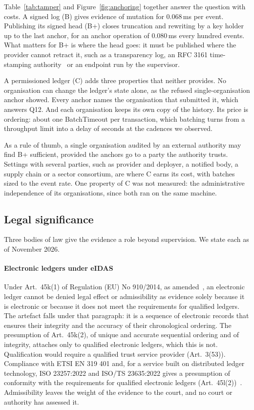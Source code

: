 Table~\ref{tab:tamper} and Figure~\ref{fig:anchoring} together answer the question with costs. A signed log (B) gives evidence of mutation for 0.068\,ms per event. Publishing its signed head (B+) closes truncation and rewriting by a key holder up to the last anchor, for an anchor operation of 0.080\,ms every hundred events. What matters for B+ is where the head goes: it must be published where the provider cannot retract it, such as a transparency log, an RFC 3161 time-stamping authority~\cite{rfc3161} or an endpoint run by the supervisor.

A permissioned ledger (C) adds three properties that neither provides. No organisation can change the ledger's state alone, as the refused single-organisation anchor showed. Every anchor names the organisation that submitted it, which answers Q12. And each organisation keeps its own copy of the history. Its price is ordering: about one BatchTimeout per transaction, which batching turns from a throughput limit into a delay of seconds at the cadences we observed.

As a rule of thumb, a single organisation audited by an external authority may find B+ sufficient, provided the anchors go to a party the authority trusts. Settings with several parties, such as provider and deployer, a notified body, a supply chain or a sector consortium, are where C earns its cost, with batches sized to the event rate. One property of C was not measured: the administrative independence of its organisations, since both ran on the same machine.

\subsection{Legal significance}
\label{sec:disc-legal}

Three bodies of law give the evidence a role beyond supervision. We state each as of November 2026.

\paragraph{Electronic ledgers under eIDAS} Under Art.~45k(1) of Regulation (EU) No 910/2014, as amended~\cite{eidas_2024}, an electronic ledger cannot be denied legal effect or admissibility as evidence solely because it is electronic or because it does not meet the requirements for qualified ledgers. The artefact falls under that paragraph: it is a sequence of electronic records that ensures their integrity and the accuracy of their chronological ordering. The presumption of Art.~45k(2), of unique and accurate sequential ordering and of integrity, attaches only to qualified electronic ledgers, which this is not. Qualification would require a qualified trust service provider (Art.~3(53)). Compliance with ETSI EN 319 401 and, for a service built on distributed ledger technology, ISO 23257:2022 and ISO/TS 23635:2022 gives a presumption of conformity with the requirements for qualified electronic ledgers (Art.~45l(2))~\cite{qel_2025,alamillo2024}. Admissibility leaves the weight of the evidence to the court, and no court or authority has assessed it.

